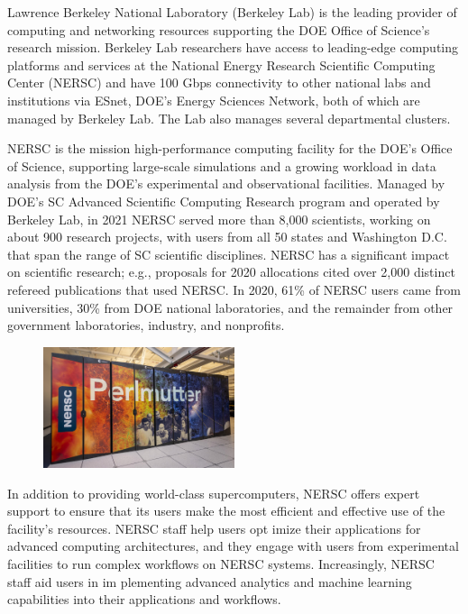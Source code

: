 
Lawrence Berkeley National Laboratory (Berkeley Lab) is the leading provider of computing and networking resources supporting the DOE Office of Science's research mission. Berkeley Lab researchers have access to leading-edge computing platforms and services at the National Energy Research Scientific Computing Center (NERSC) and have 100 Gbps connectivity to other national labs and institutions via ESnet, DOE's Energy Sciences Network, both of which are managed by Berkeley Lab. The Lab also manages several departmental clusters.


NERSC is the mission high-performance computing facility for the DOE's Office of Science, supporting large-scale simulations and a growing workload in data analysis from the DOE's experimental and observational facilities. Managed by DOE's SC Advanced Scientific Computing Research program and operated by Berkeley Lab, in 2021 NERSC served more than 8,000 scientists, working on about 900 research projects, with users from all 50 states and Washington D.C. that span the range of SC scientific disciplines. NERSC has a significant impact on scientific research; e.g., proposals for 2020 allocations cited over 2,000 distinct refereed publications that used NERSC\@. In 2020, 61\% of NERSC users came from universities, 30\% from DOE national laboratories, and the remainder from other government laboratories, industry, and nonprofits.

\begin{figure}[ht]
 \begin{center}
    \includegraphics[width=0.5\textwidth]
    {images/perlmutter.jpg}
 \end{center}
\end{figure}

In addition to providing world-class supercomputers, NERSC offers expert support to ensure that its users make the most efficient and effective use of the facility's resources. NERSC staff help users opt
imize their applications for advanced computing architectures, and they engage with users from experimental facilities to run complex workflows on NERSC systems. Increasingly, NERSC staff aid users in im
plementing advanced analytics and machine learning capabilities into their applications and workflows.

